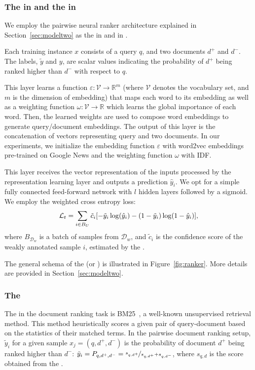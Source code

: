 \subsubsection{The \tnet in \cws and the \std in \fwl}
We employ the pairwise neural ranker architecture explained in Section~\ref{sec:modeltwo} as the \tnet in \cws and \std in \fwl. 

Each training instance $x$ consists of a query $q$, and two documents $d^+$ and $d^-$. The labels, $\tilde{y}$ and $y$, are scalar values indicating the probability of $d^+$ being ranked higher than $d^-$ with respect to $q$.

This layer learns a function $\varepsilon: \mathcal{V} \rightarrow \mathbb{R}^{m}$  (where $\mathcal{V}$ denotes the vocabulary set, and $m$ is the dimension of embedding) that maps each word to its embedding as well as a weighting function $\omega: \mathcal{V} \rightarrow \mathbb{R}$ which learns the global importance of each word. Then, the learned weights are used to compose word embeddings to generate query/document embeddings. The output of this layer is the concatenation of vectors representing query and two documents.
%
In our experiments, we initialize the embedding function $\varepsilon$ with word2vec embeddings~\citep{Mikolov:2013} pre-trained on Google News and the weighting function $\omega$ with IDF.

This layer receives the vector representation of the inputs processed by the representation learning layer and outputs a prediction $\hat{y}_i$.
We opt for a simple fully connected feed-forward network with $l$ hidden layers followed by a sigmoid. We employ the weighted cross entropy loss:
\begin{equation}
\small
\mathcal{L}_t = \sum_{i\in B_U} \tilde{c}_i [- \tilde{y}_i \log (\hat{y}_i) - (1-\tilde{y}_i) \log(1-\hat{y}_i)],
\end{equation}
where $B_{\mathcal{D}_w}$ is a batch of samples from $\mathcal{D}_w$, and $\tilde{c}_i$ is the confidence score of the weakly annotated sample $i$, estimated by the \cnet.

The general schema of the \tnet (or \std) is illustrated in Figure~\ref{fig:ranker}. More details are provided in Section~\ref{sec:modeltwo}.

\subsubsection{The \wa}
The \wa in the document ranking task is BM25~\citep{Robertson:2009}, a well-known unsupervised retrieval method. This method heuristically scores a given pair of query-document based on the statistics of their matched terms. In the pairwise document ranking setup, $\tilde{y}_i$ for a given sample $x_j = (q,d^+,d^-)$ is the probability of document $d^+$ being ranked higher than $d^-$: 
$\tilde{y}_i = P_{q,d^+,d^-} = \nicefrac{s_{q,d^+}}{s_{q,d^+} + s_{q,d^-}}$,  where $s_{q,d}$ is the score obtained from the \wa.


